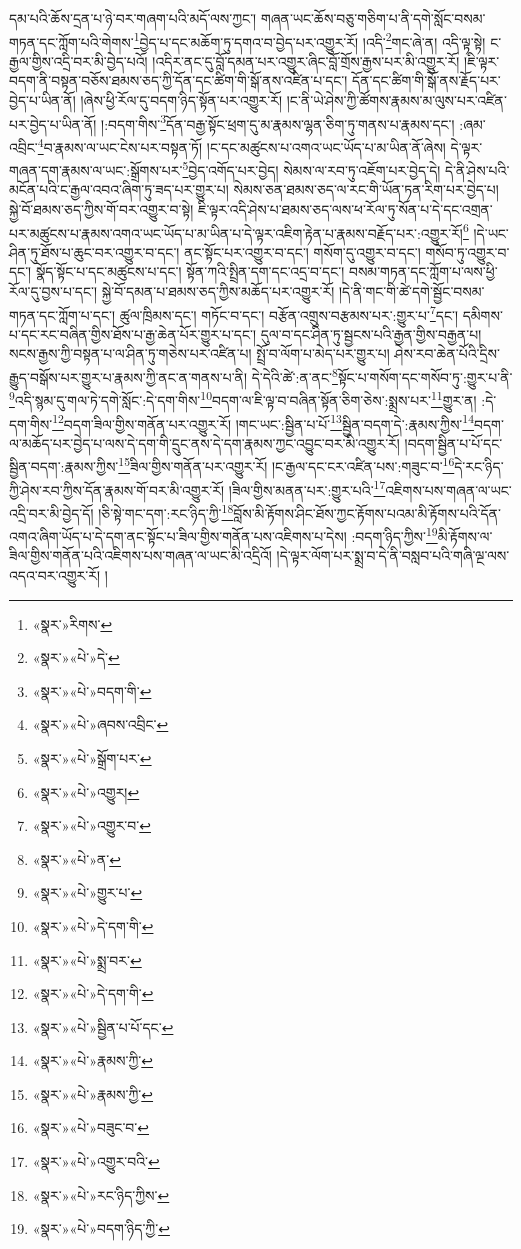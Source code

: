 དམ་པའི་ཆོས་དྲན་པ་ཉེ་བར་གཞག་པའི་མདོ་ལས་ཀྱང་། གཞན་ཡང་ཆོས་བཅུ་གཅིག་པ་ནི་དགེ་སློང་བསམ་གཏན་དང་ཀློག་པའི་གེགས་\footnote{«སྣར་»རིགས་}བྱེད་པ་དང་མཆོག་ཏུ་དགའ་བ་བྱེད་པར་འགྱུར་རོ། །འདི་\footnote{«སྣར་»«པེ་»དེ་}གང་ཞེ་ན། འདི་ལྟ་སྟེ། ང་རྒྱལ་གྱིས་འདྲི་བར་མི་བྱེད་པའོ། །འདིར་ནང་དུ་བློ་དམན་པར་འགྱུར་ཞིང་བློ་གྲོས་རྒྱས་པར་མི་འགྱུར་རོ། །ཇི་ལྟར་བདག་ནི་བསྟན་བཅོས་ཐམས་ཅད་ཀྱི་དོན་དང་ཚིག་གི་སྒོ་ནས་འཛིན་པ་དང་། དོན་དང་ཚིག་གི་སྒོ་ནས་རྗོད་པར་བྱེད་པ་ཡིན་ནོ། །ཞེས་ཕྱི་རོལ་དུ་བདག་ཉིད་སྟོན་པར་འགྱུར་རོ། །ང་ནི་ཡེ་ཤེས་ཀྱི་ཚོགས་རྣམས་མ་ལུས་པར་འཛིན་པར་བྱེད་པ་ཡིན་ནོ། །:བདག་གིས་\footnote{«སྣར་»«པེ་»བདག་གི་}དོན་བརྒྱ་སྟོང་ཕྲག་དུ་མ་རྣམས་ལྷན་ཅིག་ཏུ་གནས་པ་རྣམས་དང་། :ཞམ་འབྲིང་\footnote{«སྣར་»«པེ་»ཞབས་འབྲིང་}བ་རྣམས་ལ་ཡང་ངེས་པར་བསྟན་ཏོ། །ང་དང་མཚུངས་པ་འགའ་ཡང་ཡོད་པ་མ་ཡིན་ནོ་ཞེས། དེ་ལྟར་གཞན་དག་རྣམས་ལ་ཡང་:སྒྲོགས་པར་\footnote{«སྣར་»«པེ་»སྒྲོག་པར་}བྱེད་འགོད་པར་བྱེད། སེམས་ལ་རབ་ཏུ་འཇོག་པར་བྱེད་དེ། དེ་ནི་ཤེས་པའི་མངོན་པའི་ང་རྒྱལ་འབའ་ཞིག་ཏུ་ཟད་པར་གྱུར་པ། སེམས་ཅན་ཐམས་ཅད་ལ་རང་གི་ཡོན་ཏན་རིག་པར་བྱེད་པ། སྐྱེ་བོ་ཐམས་ཅད་ཀྱིས་གོ་བར་འགྱུར་བ་སྟེ། ཇི་ལྟར་འདི་ཤེས་པ་ཐམས་ཅད་ལས་ཕ་རོལ་ཏུ་སོན་པ་དེ་དང་འགྲན་པར་མཚུངས་པ་རྣམས་འགའ་ཡང་ཡོད་པ་མ་ཡིན་པ་དེ་ལྟར་འཇིག་རྟེན་པ་རྣམས་བརྗོད་པར་:འགྱུར་རོ།\footnote{«སྣར་»«པེ་»འགྱུར།} །དེ་ཡང་ཤིན་ཏུ་ཐོས་པ་ཆུང་བར་འགྱུར་བ་དང་། ནང་སྟོང་པར་འགྱུར་བ་དང་། གསོག་དུ་འགྱུར་བ་དང་། གསོབ་ཏུ་འགྱུར་བ་དང་། སྣོད་སྟོང་པ་དང་མཚུངས་པ་དང་། སྟོན་ཀའི་སྤྲིན་དག་དང་འདྲ་བ་དང་། བསམ་གཏན་དང་ཀློག་པ་ལས་ཕྱི་རོལ་དུ་བྱས་པ་དང་། སྐྱེ་བོ་དམན་པ་ཐམས་ཅད་ཀྱིས་མཆོད་པར་འགྱུར་རོ། །དེ་ནི་གང་གི་ཚེ་དགེ་སྦྱོང་བསམ་གཏན་དང་ཀློག་པ་དང་། ཚུལ་ཁྲིམས་དང་། གཏོང་བ་དང་། བརྩོན་འགྲུས་བརྩམས་པར་:གྱུར་པ་\footnote{«སྣར་»«པེ་»འགྱུར་བ་}དང་། དམིགས་པ་དང་རང་བཞིན་གྱིས་ཐོས་པ་རྒྱ་ཆེན་པོར་གྱུར་པ་དང་། དུལ་བ་དང་ཤིན་ཏུ་སྦྱངས་པའི་རྒྱན་གྱིས་བརྒྱན་པ། སངས་རྒྱས་ཀྱི་བསྟན་པ་ལ་ཤིན་ཏུ་གཅེས་པར་འཛིན་པ། སྤྲོ་བ་ལོག་པ་མེད་པར་གྱུར་པ། ཤེས་རབ་ཆེན་པོའི་དྲིས་རྒྱུད་བསྒོས་པར་གྱུར་པ་རྣམས་ཀྱི་ནང་ན་གནས་པ་ནི། དེ་དེའི་ཚེ་:ན་ནང་\footnote{«སྣར་»«པེ་»ན་}སྟོང་པ་གསོག་དང་གསོབ་ཏུ་:གྱུར་པ་ནི་\footnote{«སྣར་»«པེ་»གྱུར་པ་}འདི་སྙམ་དུ་གལ་ཏེ་དགེ་སློང་:དེ་དག་གིས་\footnote{«སྣར་»«པེ་»དེ་དག་གི་}བདག་ལ་ཇི་ལྟ་བ་བཞིན་སྟོན་ཅིག་ཅེས་:སྨྲས་པར་\footnote{«སྣར་»«པེ་»སྨྲ་བར་}གྱུར་ན། :དེ་དག་གིས་\footnote{«སྣར་»«པེ་»དེ་དག་གི་}བདག་ཟིལ་གྱིས་གནོན་པར་འགྱུར་རོ། །གང་ཡང་:སྦྱིན་པ་པོ་\footnote{«སྣར་»«པེ་»སྦྱིན་པ་པོ་དང་}སྦྱིན་བདག་དེ་:རྣམས་ཀྱིས་\footnote{«སྣར་»«པེ་»རྣམས་ཀྱི་}བདག་ལ་མཆོད་པར་བྱེད་པ་ལས་དེ་དག་གི་དྲུང་ནས་དེ་དག་རྣམས་ཀྱང་འབྱུང་བར་མི་འགྱུར་རོ། །བདག་སྦྱིན་པ་པོ་དང་སྦྱིན་བདག་:རྣམས་ཀྱིས་\footnote{«སྣར་»«པེ་»རྣམས་ཀྱི་}ཟིལ་གྱིས་གནོན་པར་འགྱུར་རོ། །ང་རྒྱལ་དང་ངར་འཛིན་པས་:གཟུང་བ་\footnote{«སྣར་»«པེ་»བཟུང་བ་}དེ་རང་ཉིད་ཀྱི་ཤེས་རབ་ཀྱིས་དོན་རྣམས་གོ་བར་མི་འགྱུར་རོ། །ཟིལ་གྱིས་མནན་པར་:གྱུར་པའི་\footnote{«སྣར་»«པེ་»འགྱུར་བའི་}འཇིགས་པས་གཞན་ལ་ཡང་འདྲི་བར་མི་བྱེད་དོ། །ཅི་སྟེ་གང་དག་:རང་ཉིད་ཀྱི་\footnote{«སྣར་»«པེ་»རང་ཉིད་ཀྱིས་}བློས་མི་རྟོགས་ཤིང་ཐོས་ཀྱང་རྟོགས་པའམ་མི་རྟོགས་པའི་དོན་འགའ་ཞིག་ཡོད་པ་དེ་དག་ནང་སྟོང་པ་ཟིལ་གྱིས་གནོན་པས་འཇིགས་པ་དེས། :བདག་ཉིད་ཀྱིས་\footnote{«སྣར་»«པེ་»བདག་ཉིད་ཀྱི་}མི་རྟོགས་ལ་ཟིལ་གྱིས་གནོན་པའི་འཇིགས་པས་གཞན་ལ་ཡང་མི་འདྲིའོ། །དེ་ལྟར་ལོག་པར་སྨྲ་བ་དེ་ནི་བསླབ་པའི་གཞི་ལྔ་ལས་འདའ་བར་འགྱུར་རོ། །
